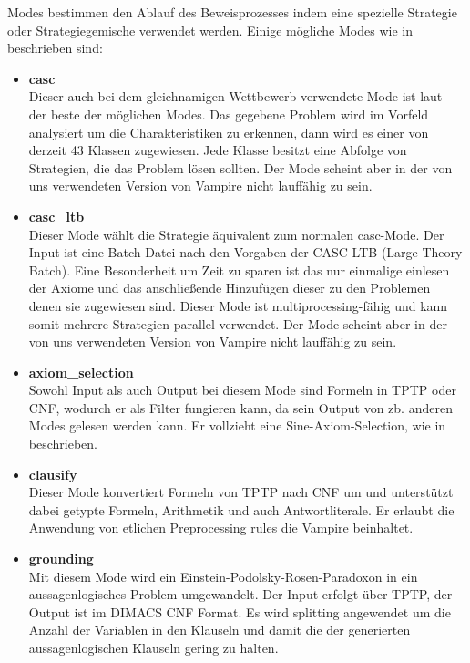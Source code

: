 \documentclass{article}
\begin{document}
Modes bestimmen den Ablauf des Beweisprozesses indem eine spezielle Strategie oder Strategiegemische verwendet werden. 
Einige mögliche Modes wie in ~\cite{hoder2011slides} beschrieben sind:
\begin{itemize}
	\item \textbf{casc} \\
	Dieser auch bei dem gleichnamigen Wettbewerb verwendete Mode ist laut ~\cite{hoder2011slides}  der beste der möglichen Modes.
	Das gegebene Problem wird im Vorfeld analysiert um die Charakteristiken zu erkennen, dann wird es einer von derzeit 43 Klassen zugewiesen. Jede Klasse besitzt eine Abfolge von Strategien, die das Problem lösen sollten.
	Der Mode scheint aber in der von uns verwendeten Version von Vampire nicht lauffähig zu sein.\\
	\item \textbf{casc\_ltb} \\
	Dieser Mode wählt die Strategie äquivalent zum normalen casc-Mode. Der Input ist eine Batch-Datei nach den Vorgaben der CASC LTB (Large Theory Batch). Eine Besonderheit um Zeit zu sparen ist das nur einmalige einlesen der Axiome und das anschließende Hinzufügen dieser zu den Problemen denen sie zugewiesen sind. Dieser Mode ist multiprocessing-fähig und kann somit mehrere Strategien parallel verwendet.
	Der Mode scheint aber in der von uns verwendeten Version von Vampire nicht lauffähig zu sein.\\
	\item\textbf{ axiom\_selection} \\
	Sowohl Input als auch Output bei diesem Mode sind Formeln in TPTP oder CNF, wodurch er als Filter fungieren kann, da sein Output von zb. anderen Modes gelesen werden kann.
	Er vollzieht eine Sine-Axiom-Selection, wie in ~\cite{sinquanon} beschrieben.\\
	\item \textbf{clausify} \\
	Dieser Mode konvertiert Formeln von TPTP nach CNF um und unterstützt dabei getypte Formeln, Arithmetik und auch Antwortliterale. Er erlaubt die Anwendung von etlichen Preprocessing rules die Vampire beinhaltet. \\
	\item \textbf{grounding} \\
	Mit diesem Mode wird ein Einstein-Podolsky-Rosen-Paradoxon in ein aussagenlogisches Problem umgewandelt. Der Input erfolgt über TPTP, der Output ist im DIMACS CNF Format.
	Es wird splitting angewendet um die Anzahl der Variablen in den Klauseln und damit die der generierten aussagenlogischen Klauseln gering zu halten. \\

\end{itemize}
\end{document}
